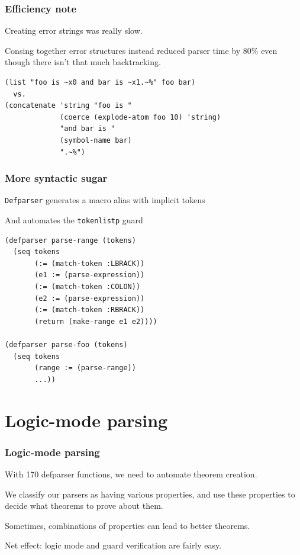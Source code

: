 \documentclass{beamer}
\newcommand{\SmallSkip}{\vspace{0.5cm}\noindent}
\begin{document}
\begin{frame}[fragile]
\frametitle{Efficiency note}
Creating error strings was really slow.

\SmallSkip 
Consing together error structures instead reduced parser time by
80\% even though there isn't that much backtracking.

{\small
\begin{verbatim}
(list "foo is ~x0 and bar is ~x1.~%" foo bar)
  vs.
(concatenate 'string "foo is " 
             (coerce (explode-atom foo 10) 'string)
             "and bar is "
             (symbol-name bar)
             ".~%")
\end{verbatim}}
\end{frame}


\begin{frame}[fragile]
\frametitle{More syntactic sugar}

{\tt Defparser} generates a macro alias with implicit tokens

And automates the {\tt tokenlistp} guard

\begin{verbatim}
(defparser parse-range (tokens)
  (seq tokens
       (:= (match-token :LBRACK))
       (e1 := (parse-expression))
       (:= (match-token :COLON))
       (e2 := (parse-expression))
       (:= (match-token :RBRACK))
       (return (make-range e1 e2))))

(defparser parse-foo (tokens)
  (seq tokens
       (range := (parse-range))
       ...))
\end{verbatim}

\end{frame}




\section{Logic-mode parsing}
\begin{frame}[fragile]
\frametitle{Logic-mode parsing}

With 170 defparser functions, we need to automate theorem creation.

\SmallSkip
We classify our parsers as having various properties, and use these
properties to decide what theorems to prove about them.

\SmallSkip
Sometimes, combinations of properties can lead to better theorems.

\SmallSkip
Net effect: logic mode and guard verification are fairly easy.
\end{frame}
\end{document}
